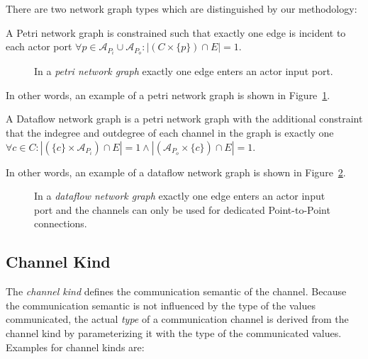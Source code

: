 There are two network graph types which are distinguished by our methodology:

\begin{definition}\label{petri-network-graph}
  A Petri network graph is constrained such that exactly
  one edge is incident to each actor port
  $\forall{p \in \mathcal{A}_{P_{i}} \cup \mathcal{A}_{P_{o}}}: |(C \times \{p\}) \cap E| = 1$.
\end{definition}

\begin{figure}
\centering

\caption{\label{ng-petri}
  In a \emph{petri network graph} exactly
  one edge enters an actor input port.}
\end{figure}

  In other words, an example of a petri network graph is shown in Figure~\ref{ng-petri}.

\begin{definition}\label{dataflow-network-graph}
  A Dataflow network graph is a petri network graph with the additional constraint
  that the indegree and outdegree of each channel in the graph is exactly one
  $\forall{c \in C}: |(\{c\} \times \mathcal{A}_{P_{i}}) \cap E| = 1 \wedge
                    |(\mathcal{A}_{P_{o}} \times \{c\}) \cap E| = 1$.
\end{definition}

  In other words, an example of a dataflow network graph is shown in Figure~\ref{ng-dataflow}.

\begin{figure}
\centering

\caption{\label{ng-dataflow}
  In a \emph{dataflow network graph} exactly
  one edge enters an actor input port and
  the channels can only be used for dedicated
  Point-to-Point connections.}
\end{figure}

\subsection{Channel Kind}\label{channel-kind}

The \emph{channel kind} defines the communication semantic of the channel.
Because the communication semantic is not influenced by the
type of the values communicated, the actual \emph{type} of a communication
channel is derived from the channel kind by parameterizing it with
the type of the communicated values. Examples for channel kinds are:

